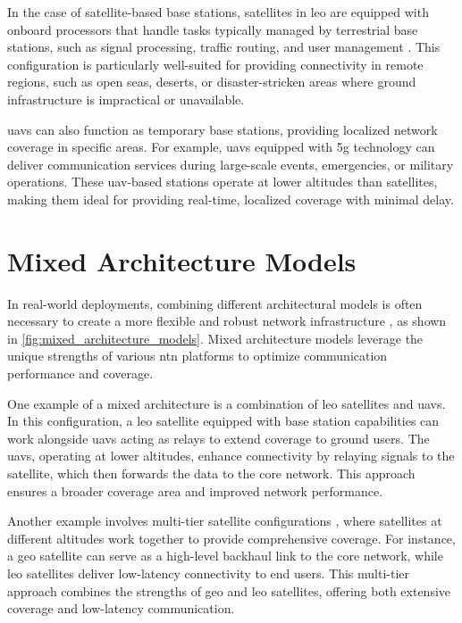 In the case of satellite-based base stations, satellites in \gls{leo} are equipped with onboard processors that handle tasks typically managed by terrestrial base stations, such as signal processing, traffic routing, and user management \autocite{leo_platforms_in_ntn}. This configuration is particularly well-suited for providing connectivity in remote regions, such as open seas, deserts, or disaster-stricken areas where ground infrastructure is impractical or unavailable.

\glspl{uav} can also function as temporary base stations, providing localized network coverage in specific areas. For example, \glspl{uav} equipped with \gls{5g} technology can deliver communication services during large-scale events, emergencies, or military operations. These \gls{uav}-based stations operate at lower altitudes than satellites, making them ideal for providing real-time, localized coverage with minimal delay.

\section{Mixed Architecture Models}\label{sec:mixed_architecture_models}

In real-world deployments, combining different architectural models is often necessary to create a more flexible and robust network infrastructure \autocite{hybrid_satellite_terrestrial_networks}, as shown in \cref{fig:mixed_architecture_models}. Mixed architecture models leverage the unique strengths of various \gls{ntn} platforms to optimize communication performance and coverage.

One example of a mixed architecture is a combination of \gls{leo} satellites and \glspl{uav}. In this configuration, a \gls{leo} satellite equipped with base station capabilities can work alongside \glspl{uav} acting as relays to extend coverage to ground users. The \glspl{uav}, operating at lower altitudes, enhance connectivity by relaying signals to the satellite, which then forwards the data to the core network. This approach ensures a broader coverage area and improved network performance.

Another example involves multi-tier satellite configurations \autocite{5g_allstar}, where satellites at different altitudes work together to provide comprehensive coverage. For instance, a \gls{geo} satellite can serve as a high-level backhaul link to the core network, while \gls{leo} satellites deliver low-latency connectivity to end users. This multi-tier approach combines the strengths of \gls{geo} and \gls{leo} satellites, offering both extensive coverage and low-latency communication.


